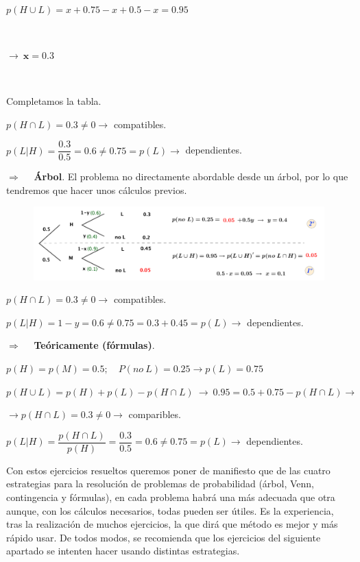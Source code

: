 \begin{example}
\begin{multicols}{2}
$\quad$

$p(H\cup L)=x+0.75-x+0.5-x=0.95$

$\quad$

$\to \ \boldsymbol{x=0.3}$

$\quad$

Completamos la tabla.
\end{multicols}
$p(H\cap L)=0.3\neq 0 \to $ compatibles.

\vspace{2mm} $p(L|H)=\dfrac{0.3}{0.5}=0.6\neq 0.75=p(L)\to$ dependientes.

\vspace{4mm} $\boldsymbol{\Rightarrow}\quad $ \textbf{Árbol}.
El problema no directamente abordable desde un árbol, por lo que tendremos que hacer unos cálculos previos.

	\begin{figure}[H]
				\centering
			\includegraphics[width=1\textwidth]{imagenes/imagenes02/T02IM27.png}
	\end{figure}
	
$p(H\cap L)=0.3\neq 0 \to $ compatibles.

\vspace{2mm}  $p(L|H)=1-y=0.6\neq 0.75 =0.3+0.45=p(L)\to $ dependientes.


\vspace{4mm} $\boldsymbol{\Rightarrow}\quad $ \textbf{Teóricamente (fórmulas)}.
	
$p(H)=p(M)=0.5;\quad P(no \ L)=0.25 \to p(L)=0.75$

\vspace{2mm}  $p(H\cup L)=p(H)+p(L)-p(H\cap L) \ \to \ 0.95=0.5+0.75-p(H\cap L) \to $

\vspace{2mm}  $\to p(H\cap L)=0.3 \neq 0\to $ comparibles.

\vspace{2mm} $p(L|H)=\dfrac{p(H\cap L)}{p(H)}=\dfrac{0.3}{0.5}=0.6\neq 0.75=p(L) \to $ dependientes.
\end{example}

Con estos ejercicios resueltos queremos poner de manifiesto que de las cuatro estrategias para la resolución de problemas de probabilidad (árbol, Venn, contingencia y fórmulas), en cada problema habrá una más adecuada que otra aunque, con los cálculos necesarios, todas pueden ser útiles. Es la experiencia, tras la realización de muchos ejercicios, la que dirá que método es mejor y más rápido usar. De todos modos, se recomienda que los ejercicios del siguiente apartado se intenten hacer usando distintas estrategias.

